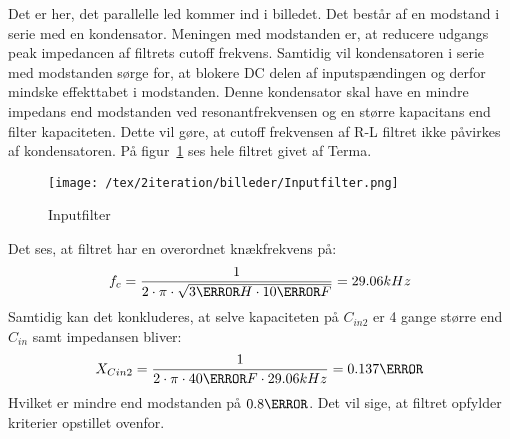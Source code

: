 Det er her, det parallelle led kommer ind i billedet. Det består af en modstand i serie med en kondensator. Meningen med modstanden er, at reducere udgangs peak impedancen af filtrets cutoff frekvens. Samtidig vil kondensatoren i serie med modstanden sørge for, at blokere DC delen af inputspændingen og derfor mindske effekttabet i modstanden. Denne kondensator skal have en mindre impedans end modstanden ved resonantfrekvensen og en større kapacitans end filter kapaciteten. Dette vil gøre, at cutoff frekvensen af R-L filtret ikke påvirkes af kondensatoren. På figur~\ref{fig: Inputfilter} ses hele filtret givet af Terma.    
\begin{figure}[H]
	\center
	\texttt{[image: /tex/2iteration/billeder/Inputfilter.png]}
	\caption{Inputfilter}
	\label{fig: Inputfilter}
\end{figure}
Det ses, at filtret har en overordnet knækfrekvens på:
\begin{equation} \label{fc}
f_c = \frac{1}{2 \cdot \pi \cdot \sqrt{3\micro H \cdot 10\micro F}} = 29.06kHz
\end{equation}
Samtidig kan det konkluderes, at selve kapaciteten på $C_{in2}$ er 4 gange større end $C_{in}$ samt impedansen bliver:
\begin{equation} \label{XC2}
X_{Cin2} = \frac{1}{2 \cdot \pi \cdot 40\micro F \cdot 29.06kHz} = 0.137\ohm
\end{equation}
Hvilket er mindre end modstanden på $0.8\ohm$. Det vil sige, at filtret opfylder kriterier opstillet ovenfor.
